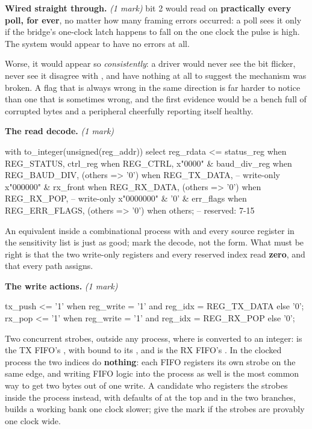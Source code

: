 \textbf{Wired straight through.} \textit{(1 mark)}  bit 2 would read  on
\textbf{practically every poll, for ever}, no matter how many framing errors occurred: a poll sees it
only if the bridge's one-clock latch happens to fall on the one clock the pulse is high. The system
would appear to have no errors at all.

Worse, it would appear so \emph{consistently}: a driver would never see the bit flicker, never see
it disagree with , and have nothing at all to suggest the mechanism was broken. A
flag that is always wrong in the same direction is far harder to notice than one that is sometimes
wrong, and the first evidence would be a bench full of corrupted bytes and a peripheral cheerfully
reporting itself healthy.

\textbf{The read decode.} \textit{(1 mark)}

\begin{vhdlcode}
with to_integer(unsigned(reg_addr)) select reg_rdata <=
    status_reg                           when REG_STATUS,
    ctrl_reg                             when REG_CTRL,
    x"0000" & baud_div_reg               when REG_BAUD_DIV,
    (others => '0')                      when REG_TX_DATA,     -- write-only
    x"000000" & rx_front                 when REG_RX_DATA,
    (others => '0')                      when REG_RX_POP,      -- write-only
    x"0000000" & '0' & err_flags         when REG_ERR_FLAGS,
    (others => '0')                      when others;          -- reserved: 7-15
\end{vhdlcode}

\noindent An equivalent  inside a combinational process with  and every
source register in the sensitivity list is just as good; mark the decode, not the form. What must be
right is that the two write-only registers and every reserved index read \textbf{zero}, and that
every path assigns.

\textbf{The write actions.} \textit{(1 mark)}

\begin{vhdlcode}
tx_push <= '1' when reg_write = '1' and reg_idx = REG_TX_DATA else '0';
rx_pop  <= '1' when reg_write = '1' and reg_idx = REG_RX_POP  else '0';
\end{vhdlcode}

\noindent Two concurrent strobes, outside any process, where  is 
converted to an integer:  is the TX FIFO's , with
 bound to its , and  is the RX FIFO's
. In the clocked process the two indices do \textbf{nothing}: each FIFO registers its own
strobe on the same edge, and writing FIFO logic into the process as well is the most common way to
get two bytes out of one write. A candidate who registers the strobes inside the process instead,
with defaults of  at the top and  in the two branches, builds a working bank one
clock slower; give the mark if the strobes are provably one clock wide.

